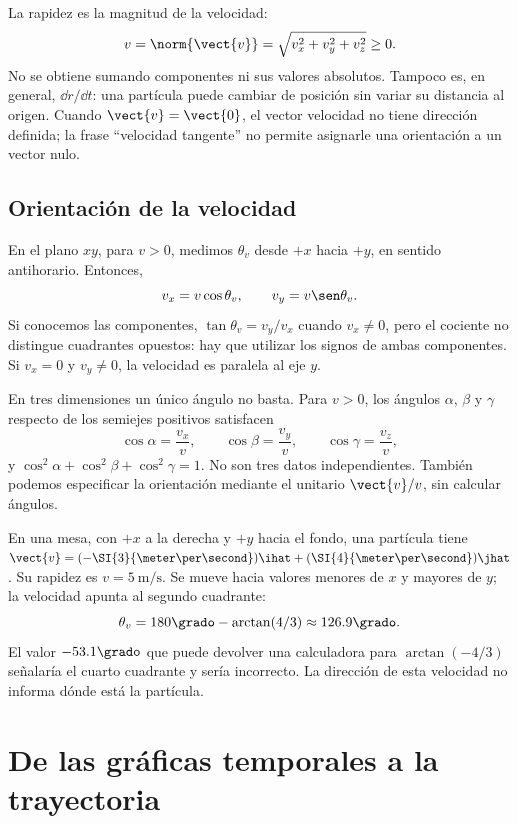 La rapidez es la magnitud de la velocidad:
\[ v=\norm{\vect{v}}=\sqrt{v_x^2+v_y^2+v_z^2}\geq0. \]
No se obtiene sumando componentes ni sus valores absolutos. Tampoco es,
en general, \(\dd r/\dd t\): una partícula puede cambiar de posición sin
variar su distancia al origen. Cuando \(\vect{v}=\vect{0}\), el vector
velocidad no tiene dirección definida; la frase ``velocidad tangente'' no
permite asignarle una orientación a un vector nulo.

\subsection{Orientación de la velocidad}

En el plano \(xy\), para \(v>0\), medimos \(\theta_v\) desde \(+x\)
hacia \(+y\), en sentido antihorario. Entonces,
\[ v_x=v\cos\theta_v,\qquad v_y=v\sen\theta_v. \]
Si conocemos las componentes, \(\tan\theta_v=v_y/v_x\) cuando
\(v_x\ne0\), pero el cociente no distingue cuadrantes opuestos: hay que
utilizar los signos de ambas componentes. Si \(v_x=0\) y \(v_y\ne0\),
la velocidad es paralela al eje \(y\).

En tres dimensiones un único ángulo no basta. Para \(v>0\), los ángulos
\(\alpha\), \(\beta\) y \(\gamma\) respecto de los semiejes positivos
satisfacen
\[ \cos\alpha=\frac{v_x}{v},\qquad
\cos\beta=\frac{v_y}{v},\qquad \cos\gamma=\frac{v_z}{v}, \]
y \(\cos^2\alpha+\cos^2\beta+\cos^2\gamma=1\). No son tres datos
independientes. También podemos especificar la orientación mediante
el unitario \(\vect{v}/v\), sin calcular ángulos.

\begin{ejemplo}
En una mesa, con \(+x\) a la derecha y \(+y\) hacia el fondo, una partícula
tiene \(\vect{v}=(-\SI{3}{\meter\per\second})\ihat
+(\SI{4}{\meter\per\second})\jhat\). Su rapidez es
\(v=\SI{5}{\meter\per\second}\). Se mueve hacia valores menores de \(x\)
y mayores de \(y\); la velocidad apunta al segundo cuadrante:
\[ \theta_v=180\grado-\arctan(4/3)\approx126.9\grado. \]
El valor \(-53.1\grado\) que puede devolver una calculadora para
\(\arctan(-4/3)\) señalaría el cuarto cuadrante y sería incorrecto.
La dirección de esta velocidad no informa dónde está la partícula.
\end{ejemplo}

\section{De las gráficas temporales a la trayectoria}

